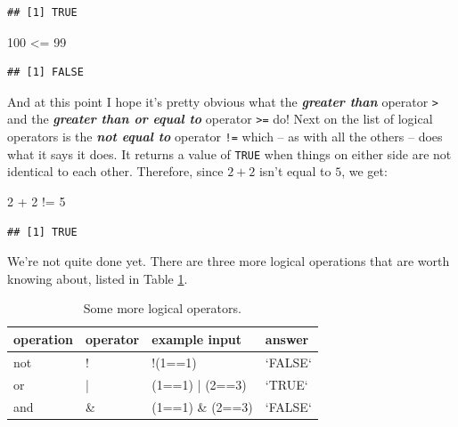 \documentclass[
]{book}
\newenvironment{Shaded}{\begin{snugshade}}{\end{snugshade}}
\newcommand{\DecValTok}[1]{\textcolor[rgb]{0.00,0.00,0.81}{#1}}
\newcommand{\SpecialCharTok}[1]{\textcolor[rgb]{0.00,0.00,0.00}{#1}}
\begin{document}
\begin{verbatim}
## [1] TRUE
\end{verbatim}

\begin{Shaded}
\begin{Highlighting}[]
\DecValTok{100} \SpecialCharTok{\textless{}=} \DecValTok{99}
\end{Highlighting}
\end{Shaded}

\begin{verbatim}
## [1] FALSE
\end{verbatim}

And at this point I hope it's pretty obvious what the \textbf{\emph{greater than}} operator \texttt{\textgreater{}} and the \textbf{\emph{greater than or equal to}} operator \texttt{\textgreater{}=} do! Next on the list of logical operators is the \textbf{\emph{not equal to}} operator \texttt{!=} which -- as with all the others -- does what it says it does. It returns a value of \texttt{TRUE} when things on either side are not identical to each other. Therefore, since \(2+2\) isn't equal to \(5\), we get:

\begin{Shaded}
\begin{Highlighting}[]
\DecValTok{2} \SpecialCharTok{+} \DecValTok{2} \SpecialCharTok{!=} \DecValTok{5}
\end{Highlighting}
\end{Shaded}

\begin{verbatim}
## [1] TRUE
\end{verbatim}

We're not quite done yet. There are three more logical operations that are worth knowing about, listed in Table \ref{tab:logicals2}.

\begin{table}

\caption{\label{tab:logicals2}Some more logical operators.}
\centering
\begin{tabular}[t]{llll}
\toprule
operation & operator & example input & answer\\
\midrule
not & ! & !(1==1) & `FALSE`\\
or & | & (1==1) | (2==3) & `TRUE`\\
and & \& & (1==1) \& (2==3) & `FALSE`\\
\bottomrule
\end{tabular}
\end{table}
\end{document}
